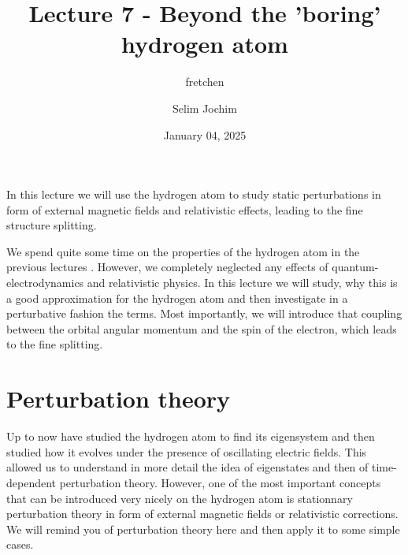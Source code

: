 \documentclass[10pt]{article}
\let\cite\citep
\renewenvironment{abstract}
  {{\bfseries\noindent{\abstractname}\par\nobreak}\footnotesize}
  {\bigskip}
\providecommand\citep{\cite}
\begin{document}
\title{Lecture 7 - Beyond the 'boring' hydrogen atom}



\author[1]{fretchen}%
\author[2]{Selim Jochim}%
%
%


\vspace{-1em}



  
  \date{January 04, 2025}


\begingroup
\let\center\flushleft
\let\endcenter\endflushleft
\maketitle
\endgroup





\begin{abstract}
In this lecture we will use the hydrogen atom to study static perturbations in form of external magnetic fields  and relativistic effects, leading to the fine structure splitting.%
\end{abstract}%



\sloppy


We spend quite some time on the properties of the hydrogen atom in the previous lectures \cite{Jendrzejewski,atom}. However, we completely neglected any effects of quantum-electrodynamics and relativistic physics. In this lecture we will study, why this is a good approximation for the hydrogen atom and then investigate in a perturbative fashion the terms. Most importantly, we will introduce that coupling between the orbital angular momentum and the spin of the electron, which leads to the fine splitting.

\section{Perturbation theory}
Up to now have studied the hydrogen atom to find its eigensystem and then studied how it evolves under the presence of oscillating electric fields. This allowed us to understand in more detail the idea of eigenstates and then of time-dependent perturbation theory. However, one of the most important concepts that can be introduced very nicely on the hydrogen atom is stationnary perturbation theory in form of external magnetic fields or relativistic corrections. We will remind you of perturbation theory here and then apply it to some simple cases.
\end{document}
